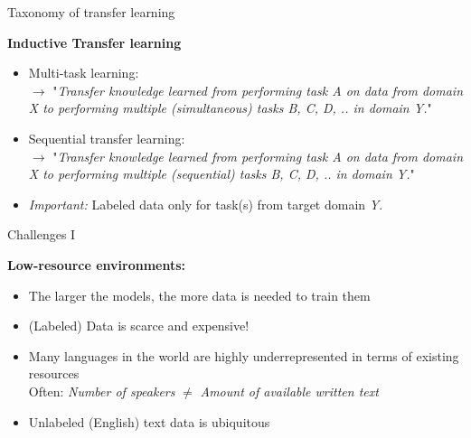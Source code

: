 
\begin{frame}{Taxonomy of transfer learning \href{https://ruder.io/thesis/}{}}

\vfill

	\textbf{Inductive Transfer learning}

	\begin{itemize}
		\item Multi-task learning:\\
					$\rightarrow$ "\textit{Transfer knowledge learned from performing task A on data from domain X to performing multiple (simultaneous) tasks B, C, D, .. in domain Y.}"\\\mbox{}
		\item Sequential transfer learning:\\
					$\rightarrow$ "\textit{Transfer knowledge learned from performing task A on data from domain X to performing multiple (sequential) tasks B, C, D, .. in domain Y.}"\\\mbox{}
		\item \textit{Important:} Labeled data only for task(s) from target domain \textit{Y}.
	\end{itemize}
	
\vfill

\end{frame}


\begin{vbframe}{Challenges I}

\vfill

\textbf{Low-resource environments:}

\begin{itemize}
	\item The larger the models, the more data is needed to train them
	\item (Labeled) Data is scarce and expensive!
	\item Many languages in the world are highly underrepresented in terms of existing resources\\
						Often: \textit{Number of speakers} $\neq$ \textit{Amount of available written text}
	\item Unlabeled (English) text data is ubiquitous
\end{itemize}

\vfill

\end{vbframe}

